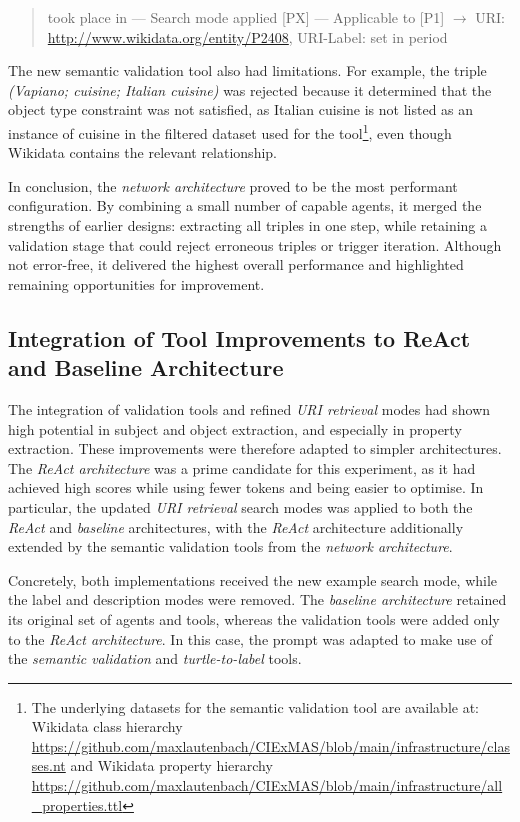 \documentclass[a4paper,oneside,bibliography=totoc]{scrbook}
\begin{document}
\begin{quote}
  took place in — Search mode applied [P\textbar X] — Applicable to [P1] $\rightarrow$ URI: \url{http://www.wikidata.org/entity/P2408}, URI-Label: set in period
\end{quote}

The new semantic validation tool also had limitations. For example, the triple \textit{(Vapiano; cuisine; Italian cuisine)} was rejected because it determined that the object type constraint was not satisfied, as Italian cuisine is not listed as an instance of cuisine in the filtered dataset used for the tool\footnote{The underlying datasets for the semantic validation tool are available at: Wikidata class hierarchy \url{https://github.com/maxlautenbach/CIExMAS/blob/main/infrastructure/classes.nt} and Wikidata property hierarchy \url{https://github.com/maxlautenbach/CIExMAS/blob/main/infrastructure/all_properties.ttl}}, even though Wikidata contains the relevant relationship.

In conclusion, the \textit{network architecture} proved to be the most performant configuration. By combining a small number of capable agents, it merged the strengths of earlier designs: extracting all triples in one step, while retaining a validation stage that could reject erroneous triples or trigger iteration. Although not error-free, it delivered the highest overall performance and highlighted remaining opportunities for improvement.

\subsection{Integration of Tool Improvements to ReAct and Baseline Architecture}
\label{subsec:performance_increases_gen2}

The integration of validation tools and refined \textit{URI retrieval} modes had shown high potential in subject and object extraction, and especially in property extraction. These improvements were therefore adapted to simpler architectures. The \textit{ReAct architecture} was a prime candidate for this experiment, as it had achieved high scores while using fewer tokens and being easier to optimise. In particular, the updated \textit{URI retrieval} search modes was applied to both the \textit{ReAct} and \textit{baseline} architectures, with the \textit{ReAct} architecture additionally extended by the semantic validation tools from the \textit{network architecture}.

Concretely, both implementations received the new example search mode, while the label and description modes were removed. The \textit{baseline architecture} retained its original set of agents and tools, whereas the validation tools were added only to the \textit{ReAct architecture}. In this case, the prompt was adapted to make use of the \textit{semantic validation} and \textit{turtle-to-label} tools.
\end{document}
